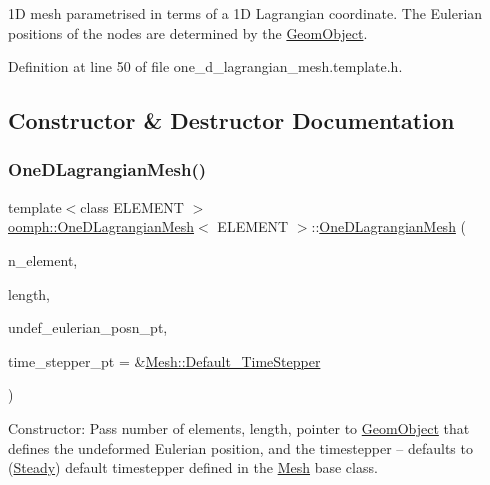 1D mesh parametrised in terms of a 1D Lagrangian coordinate. The Eulerian positions of the nodes are determined by the \hyperlink{classoomph_1_1GeomObject}{Geom\+Object}. 

Definition at line 50 of file one\+\_\+d\+\_\+lagrangian\+\_\+mesh.\+template.\+h.



\subsection{Constructor \& Destructor Documentation}
\mbox{\label{classoomph_1_1OneDLagrangianMesh_a7061998be3fb4131c6b58c4943595d49}} 
\subsubsection{\texorpdfstring{One\+D\+Lagrangian\+Mesh()}{OneDLagrangianMesh()}\hspace{0.1cm}{\footnotesize\ttfamily [1/2]}}
{\footnotesize\ttfamily template$<$class E\+L\+E\+M\+E\+NT $>$ \\
\hyperlink{classoomph_1_1OneDLagrangianMesh}{oomph\+::\+One\+D\+Lagrangian\+Mesh}$<$ E\+L\+E\+M\+E\+NT $>$\+::\hyperlink{classoomph_1_1OneDLagrangianMesh}{One\+D\+Lagrangian\+Mesh} (\begin{DoxyParamCaption}\item[{const unsigned \&}]{n\+\_\+element,  }\item[{const double \&}]{length,  }\item[{\hyperlink{classoomph_1_1GeomObject}{Geom\+Object} $\ast$}]{undef\+\_\+eulerian\+\_\+posn\+\_\+pt,  }\item[{\hyperlink{classoomph_1_1TimeStepper}{Time\+Stepper} $\ast$}]{time\+\_\+stepper\+\_\+pt = {\ttfamily \&\hyperlink{classoomph_1_1Mesh_a12243d0fee2b1fcee729ee5a4777ea10}{Mesh\+::\+Default\+\_\+\+Time\+Stepper}} }\end{DoxyParamCaption})}



Constructor\+: Pass number of elements, length, pointer to \hyperlink{classoomph_1_1GeomObject}{Geom\+Object} that defines the undeformed Eulerian position, and the timestepper -- defaults to (\hyperlink{classoomph_1_1Steady}{Steady}) default timestepper defined in the \hyperlink{classoomph_1_1Mesh}{Mesh} base class. 

